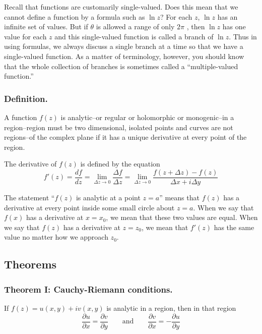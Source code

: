 \documentclass[../../../main.tex]{subfiles}
\begin{document}
Recall that functions are customarily single-valued. Does this mean that we cannot deﬁne a function by a formula such as $\ln z$? For each $z$, $\ln z$ has an inﬁnite set of values. But if $\theta$ is allowed a range of only $2\pi$ , then $\ln z$ has one value for each $z$ and this single-valued function is
called a branch of $\ln z$. Thus in using formulas, we always discuss a single branch at a time so that we have a single-valued function. As a matter of terminology, however, you should know that the
whole collection of branches is sometimes called a “multiple-valued function.”

\subsubsection{Definition.} A function $f(z)$ is analytic--or regular or holomorphic or monogenic--in a region--region must be two dimensional, isolated points and curves are not regions--of the complex plane if it has a unique derivative at every point of the region.

The derivative of $f(z)$ is deﬁned by the equation
\begin{equation*}
    f'(z)=\frac{df}{dz}=\lim_{\Delta z\rightarrow 0}\frac{\Delta f}{\Delta z}=\lim_{\Delta z\rightarrow 0} \frac{f(z + \Delta z) - f(z)}{\Delta x + i\Delta y}
\end{equation*}

The statement “$f(z)$ is analytic at a point $z = a$” means that $f(z)$ has a derivative at every point inside some small circle about $z = a$. When we say that $f(x)$ has a derivative at $x = x_0$, we mean that these two values are equal. When we say that $f(z)$ has a derivative at $z = z_0$, we mean that $f'(z)$ has the same value no matter how we approach $z_0$.

\subsection{Theorems}
\subsubsection{Theorem I: Cauchy-Riemann conditions.} If $f(z) = u(x, y) + iv(x, y)$ is analytic in a
region, then in that region
\begin{equation*}
    \frac{\partial u}{\partial x}=\frac{\partial v}{\partial y}
    \qquad\text{and}\qquad
    \frac{\partial v}{\partial x}=-\frac{\partial u}{\partial y}
\end{equation*}
\end{document}

